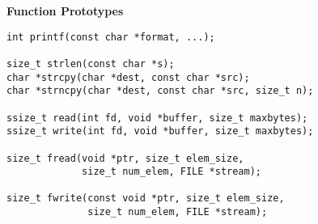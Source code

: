 {\huge \bf Function Prototypes}

\begin{small}
\begin{verbatim}
int printf(const char *format, ...);

size_t strlen(const char *s);
char *strcpy(char *dest, const char *src);
char *strncpy(char *dest, const char *src, size_t n);

ssize_t read(int fd, void *buffer, size_t maxbytes);
ssize_t write(int fd, void *buffer, size_t maxbytes);

size_t fread(void *ptr, size_t elem_size, 
             size_t num_elem, FILE *stream);

size_t fwrite(const void *ptr, size_t elem_size,
              size_t num_elem, FILE *stream);
\end{verbatim}
\end{small}
